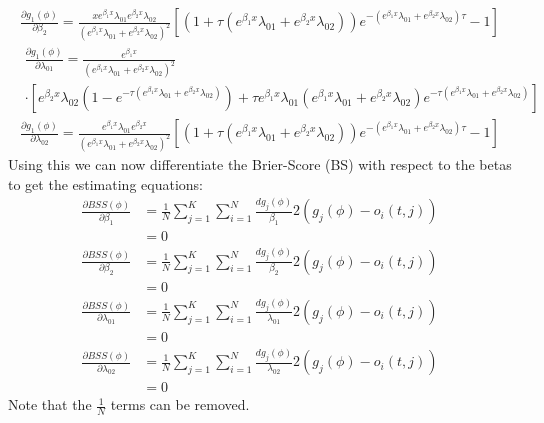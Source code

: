 \documentclass{article}
\begin{document}
\begin{align*}
\frac{\partial g_1(\phi)}{\partial\beta_2} =\frac{xe^{\beta_1x}\lambda_{01}e^{\beta_2x}\lambda_{02}}{(e^{\beta_1x}\lambda_{01}+e^{\beta_2x}\lambda_{02})^2}\left[(1+\tau(e^{\beta_1x}\lambda_{01}+e^{\beta_2x}\lambda_{02}))e^{-(e^{\beta_1x}\lambda_{01}+e^{\beta_2x}\lambda_{02})\tau}-1\right]
\end{align*}
\begin{align*}
&\frac{\partial g_1(\phi)}{\partial \lambda_{01}}
=\frac{e^{\beta_1 x}}{\left(e^{\beta_1 x}\lambda_{01}+e^{\beta_2 x}\lambda_{02}\right)^2}\\
&\cdot\left[e^{\beta_2 x}\lambda_{02}\left(1-e^{-\tau\left(e^{\beta_1 x}\lambda_{01}+e^{\beta_2 x}\lambda_{02}\right)}\right)+\tau e^{\beta_1x}\lambda_{01}\left(e^{\beta_1 x}\lambda_{01}+e^{\beta_2 x}\lambda_{02}\right)e^{-\tau\left(e^{\beta_1 x}\lambda_{01}+e^{\beta_2 x}\lambda_{02}\right)}\right]
\end{align*}
\begin{align*}
\frac{\partial g_1(\phi)}{\partial\lambda_{02}} = \frac{e^{\beta_1x}\lambda_{01}e^{\beta_2x}}{(e^{\beta_1x}\lambda_{01}+e^{\beta_2x}\lambda_{02})^2}\left[(1+\tau(e^{\beta_1x}\lambda_{01}+e^{\beta_2x}\lambda_{02}))e^{-(e^{\beta_1x}\lambda_{01}+e^{\beta_2x}\lambda_{02})\tau}-1\right]
\end{align*}
Using this we can now differentiate the Brier-Score (BS) with respect to the betas to get the estimating equations:
\begin{align*}
\frac{\partial BSS(\phi)}{\partial\beta_1} &=\frac{1}{N}\sum_{j = 1}^K\sum_{i = 1}^N \frac{dg_j(\phi)}{\beta_1}2(g_j(\phi)-o_i(t,j))\\
&= 0
\end{align*}
\begin{align*}
\frac{\partial BSS(\phi)}{\partial\beta_2} &=\frac{1}{N}\sum_{j = 1}^K\sum_{i = 1}^N \frac{dg_j(\phi)}{\beta_2}2(g_j(\phi)-o_i(t,j))\\
&= 0
\end{align*}
\begin{align*}
\frac{\partial BSS(\phi)}{\partial\lambda_{01}} &=\frac{1}{N}\sum_{j = 1}^K\sum_{i = 1}^N \frac{dg_j(\phi)}{\lambda_{01}}2(g_j(\phi)-o_i(t,j))\\
&= 0
\end{align*}
\begin{align*}
\frac{\partial BSS(\phi)}{\partial\lambda_{02}} &=\frac{1}{N}\sum_{j = 1}^K\sum_{i = 1}^N \frac{dg_j(\phi)}{\lambda_{02}}2(g_j(\phi)-o_i(t,j))\\
&= 0
\end{align*}
Note that the \(\frac{1}{N}\) terms can be removed.
\end{document}
